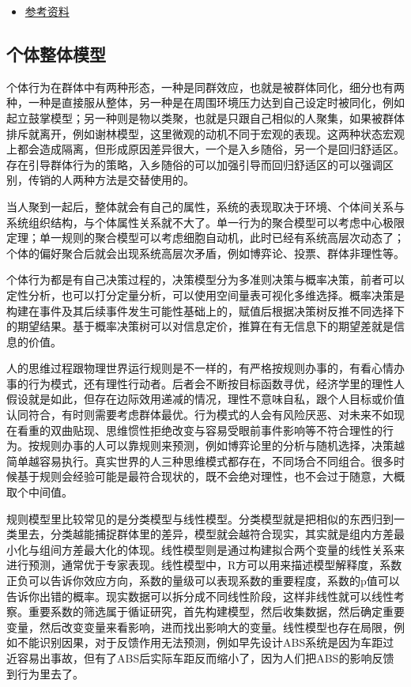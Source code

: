 \documentclass[]{tufte-book}
\providecommand{\tightlist}{%
  \setlength{\itemsep}{0pt}\setlength{\parskip}{0pt}}
\begin{document}
\begin{itemize}
\tightlist
\item
  \href{https://benlauwens.github.io/ThinkJulia.jl/latest/book.html}{参考资料}
\end{itemize}

\hypertarget{ux4e2aux4f53ux6574ux4f53ux6a21ux578b}{%
\subsection{个体整体模型}\label{ux4e2aux4f53ux6574ux4f53ux6a21ux578b}}

个体行为在群体中有两种形态，一种是同群效应，也就是被群体同化，细分也有两种，一种是直接服从整体，另一种是在周围环境压力达到自己设定时被同化，例如起立鼓掌模型；另一种则是物以类聚，也就是只跟自己相似的人聚集，如果被群体排斥就离开，例如谢林模型，这里微观的动机不同于宏观的表现。这两种状态宏观上都会造成隔离，但形成原因差异很大，一个是入乡随俗，另一个是回归舒适区。存在引导群体行为的策略，入乡随俗的可以加强引导而回归舒适区的可以强调区别，传销的人两种方法是交替使用的。

当人聚到一起后，整体就会有自己的属性，系统的表现取决于环境、个体间关系与系统组织结构，与个体属性关系就不大了。单一行为的聚合模型可以考虑中心极限定理；单一规则的聚合模型可以考虑细胞自动机，此时已经有系统高层次动态了；个体的偏好聚合后就会出现系统高层次矛盾，例如博弈论、投票、群体非理性等。

个体行为都是有自己决策过程的，决策模型分为多准则决策与概率决策，前者可以定性分析，也可以打分定量分析，可以使用空间量表可视化多维选择。概率决策是构建在事件及其后续事件发生可能性基础上的，赋值后根据决策树反推不同选择下的期望结果。基于概率决策树可以对信息定价，推算在有无信息下的期望差就是信息的价值。

人的思维过程跟物理世界运行规则是不一样的，有严格按规则办事的，有看心情办事的行为模式，还有理性行动者。后者会不断按目标函数寻优，经济学里的理性人假设就是如此，但存在边际效用递减的情况，理性不意味自私，跟个人目标或价值认同符合，有时则需要考虑群体最优。行为模式的人会有风险厌恶、对未来不如现在看重的双曲贴现、思维惯性拒绝改变与容易受眼前事件影响等不符合理性的行为。按规则办事的人可以靠规则来预测，例如博弈论里的分析与随机选择，决策越简单越容易执行。真实世界的人三种思维模式都存在，不同场合不同组合。很多时候基于规则会经验可能是最符合现状的，既不会绝对理性，也不会过于随意，大概取个中间值。

规则模型里比较常见的是分类模型与线性模型。分类模型就是把相似的东西归到一类里去，分类越能捕捉群体里的差异，模型就会越符合现实，其实就是组内方差最小化与组间方差最大化的体现。线性模型则是通过构建拟合两个变量的线性关系来进行预测，通常优于专家表现。线性模型中，R方可以用来描述模型解释度，系数正负可以告诉你效应方向，系数的量级可以表现系数的重要程度，系数的p值可以告诉你出错的概率。现实数据可以拆分成不同线性阶段，这样非线性就可以线性考察。重要系数的筛选属于循证研究，首先构建模型，然后收集数据，然后确定重要变量，然后改变变量来看影响，进而找出影响大的变量。线性模型也存在局限，例如不能识别因果，对于反馈作用无法预测，例如早先设计ABS系统是因为车距过近容易出事故，但有了ABS后实际车距反而缩小了，因为人们把ABS的影响反馈到行为里去了。
\end{document}
